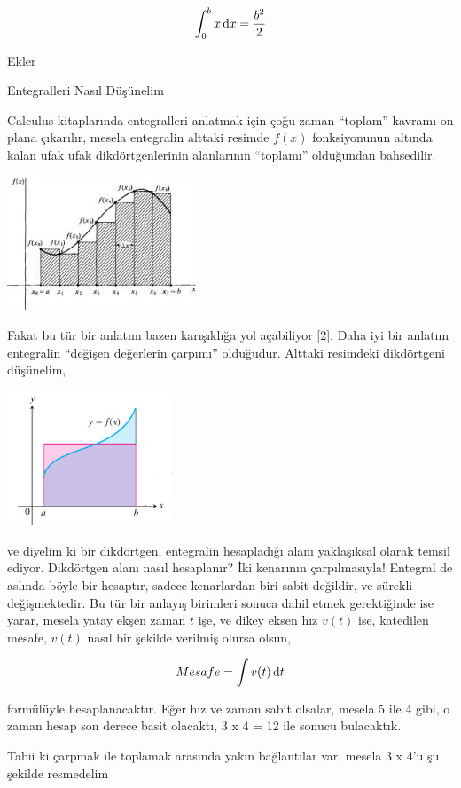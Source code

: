 \documentclass[12pt,fleqn]{article}\usepackage{../../common}
\begin{document}
$$ 
\int _{0}^{b} x \,\mathrm{d} x = \frac{b^2}{2}
$$


\newpage

Ekler

Entegralleri Nasıl Düşünelim

Calculus kitaplarında entegralleri anlatmak için çoğu zaman ``toplam''
kavramı on plana çıkarılır, mesela entegralin alttaki resimde $f(x)$
fonksiyonunun altında kalan ufak ufak dikdörtgenlerinin alanlarının
``toplamı'' olduğundan bahsedilir.

\includegraphics[height=4cm]{area.png}

Fakat bu tür bir anlatım bazen karışıklığa yol açabiliyor [2]. Daha iyi bir
anlatım entegralin ``değişen değerlerin çarpımı'' olduğudur. Alttaki
resimdeki dikdörtgeni düşünelim, 

\includegraphics[height=4cm]{box.png}

ve diyelim ki bir dikdörtgen, entegralin hesapladığı alanı yaklaşıksal
olarak temsil ediyor. Dikdörtgen alanı nasıl hesaplanır? İki kenarının
çarpılmasıyla! Entegral de aslında böyle bir hesaptır, sadece kenarlardan
biri sabit değildir, ve sürekli değişmektedir. Bu tür bir anlayış birimleri
sonuca dahil etmek gerektiğinde ise yarar, mesela yatay ekşen zaman $t$
işe, ve dikey eksen hız $v(t)$ ise, katedilen mesafe, $v(t)$ nasıl bir
şekilde verilmiş olursa olsun,

$$ Mesafe = \int v(t) \,\mathrm{d} t $$

formülüyle hesaplanacaktır. Eğer hız ve zaman sabit olsalar, mesela 5 ile 4
gibi, o zaman hesap son derece basit olacaktı, 3 x 4 = 12 ile sonucu
bulacaktık. 

Tabii ki çarpmak ile toplamak arasında yakın bağlantılar var, mesela 3 x
4'u şu şekilde resmedelim
\end{document}
